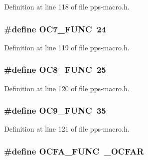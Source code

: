 Definition at line 118 of file pps-\/macro.\+h.

\hypertarget{pps-macro_8h_a9a8255318c057701fa8981f934c6e445}{}
\subsubsection[{O\+C7\+\_\+\+F\+U\+N\+C}]{\setlength{\rightskip}{0pt plus 5cm}\#define O\+C7\+\_\+\+F\+U\+N\+C~24}\label{pps-macro_8h_a9a8255318c057701fa8981f934c6e445}


Definition at line 119 of file pps-\/macro.\+h.

\hypertarget{pps-macro_8h_ac70b9e4220b87e2142bfb0d717781df3}{}
\subsubsection[{O\+C8\+\_\+\+F\+U\+N\+C}]{\setlength{\rightskip}{0pt plus 5cm}\#define O\+C8\+\_\+\+F\+U\+N\+C~25}\label{pps-macro_8h_ac70b9e4220b87e2142bfb0d717781df3}


Definition at line 120 of file pps-\/macro.\+h.

\hypertarget{pps-macro_8h_a8fdbac7525bb3267cc225d0a88a8cf7c}{}
\subsubsection[{O\+C9\+\_\+\+F\+U\+N\+C}]{\setlength{\rightskip}{0pt plus 5cm}\#define O\+C9\+\_\+\+F\+U\+N\+C~35}\label{pps-macro_8h_a8fdbac7525bb3267cc225d0a88a8cf7c}


Definition at line 121 of file pps-\/macro.\+h.

\hypertarget{pps-macro_8h_afb2a7aefaae241839563723bc087ab72}{}
\subsubsection[{O\+C\+F\+A\+\_\+\+F\+U\+N\+C}]{\setlength{\rightskip}{0pt plus 5cm}\#define O\+C\+F\+A\+\_\+\+F\+U\+N\+C~\+\_\+\+O\+C\+F\+A\+R}\label{pps-macro_8h_afb2a7aefaae241839563723bc087ab72}



